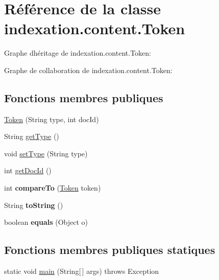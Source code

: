 \hypertarget{classindexation_1_1content_1_1Token}{}\section{Référence de la classe indexation.\+content.\+Token}
\label{classindexation_1_1content_1_1Token}


Graphe d\textquotesingle{}héritage de indexation.\+content.\+Token\+:


Graphe de collaboration de indexation.\+content.\+Token\+:
\subsection*{Fonctions membres publiques}
\begin{DoxyCompactItemize}
\item 
\hyperlink{classindexation_1_1content_1_1Token_a076e80bfca62758aa3245cc894db81c0}{Token} (String type, int doc\+Id)
\item 
String \hyperlink{classindexation_1_1content_1_1Token_ab0814c24d102e076c026a2adf23aeb30}{get\+Type} ()
\item 
void \hyperlink{classindexation_1_1content_1_1Token_a8236aaf47af22ca342d273c64f760730}{set\+Type} (String type)
\item 
int \hyperlink{classindexation_1_1content_1_1Token_a5fa3c07cbb4eccb95bcd600a183c098e}{get\+Doc\+Id} ()
\item 
\mbox{\label{classindexation_1_1content_1_1Token_ae66c1c191ed4be27cec139a9d4cf24ae}} 
int {\bfseries compare\+To} (\hyperlink{classindexation_1_1content_1_1Token}{Token} token)
\item 
\mbox{\label{classindexation_1_1content_1_1Token_a1dcd2a2abd34a3eb7ceb99a7859193df}} 
String {\bfseries to\+String} ()
\item 
\mbox{\label{classindexation_1_1content_1_1Token_a31fac4bdd386a23177bde9c0517eb1cb}} 
boolean {\bfseries equals} (Object o)
\end{DoxyCompactItemize}
\subsection*{Fonctions membres publiques statiques}
\begin{DoxyCompactItemize}
\item 
static void \hyperlink{classindexation_1_1content_1_1Token_aa26f4b5926b907410512e7d6925f8b27}{main} (String\mbox{[}$\,$\mbox{]} args)  throws Exception  	
\end{DoxyCompactItemize}


